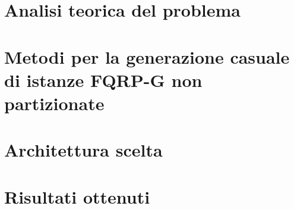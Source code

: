 \section{Analisi teorica del problema}


\section{Metodi per la generazione casuale di istanze FQRP-G non partizionate}


\section{Architettura scelta}


\section{Risultati ottenuti}


